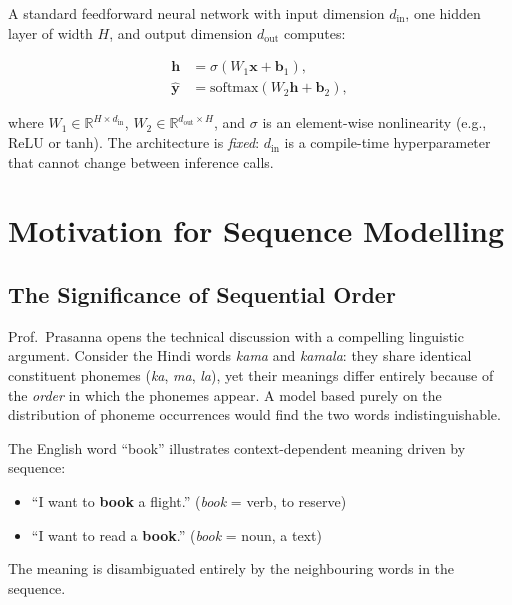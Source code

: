 \documentclass[12pt,a4paper]{article}
\begin{document}
A standard feedforward neural network with input dimension $d_{\text{in}}$,
one hidden layer of width $H$, and output dimension $d_{\text{out}}$ computes:

\begin{align}
  \label{eq:ffnn_hidden}
  \mathbf{h} &= \sigma\!\left(W_1 \mathbf{x} + \mathbf{b}_1\right), \\
  \label{eq:ffnn_output}
  \hat{\mathbf{y}} &= \text{softmax}\!\left(W_2 \mathbf{h} + \mathbf{b}_2\right),
\end{align}

where $W_1 \in \mathbb{R}^{H \times d_{\text{in}}}$,
$W_2 \in \mathbb{R}^{d_{\text{out}} \times H}$, and $\sigma$ is an
element-wise nonlinearity (e.g., ReLU or tanh).  The architecture is
\emph{fixed}: $d_{\text{in}}$ is a compile-time hyperparameter that cannot
change between inference calls.

\section{Motivation for Sequence Modelling}
\label{sec:motivation}

\subsection{The Significance of Sequential Order}
\label{subsec:order_significance}

Prof.\ Prasanna opens the technical discussion with a compelling linguistic
argument.  Consider the Hindi words \emph{kama} and \emph{kamala}: they
share identical constituent phonemes (\emph{ka}, \emph{ma}, \emph{la}), yet
their meanings differ entirely because of the \emph{order} in which the
phonemes appear.  A model based purely on the distribution of phoneme
occurrences would find the two words indistinguishable.

\begin{example}
The English word ``book'' illustrates context-dependent meaning driven by
sequence:
\begin{itemize}[nosep]
  \item ``I want to \textbf{book} a flight.'' \quad (\textit{book} = verb,
        to reserve)
  \item ``I want to read a \textbf{book}.'' \quad (\textit{book} = noun,
        a text)
\end{itemize}
The meaning is disambiguated entirely by the neighbouring words in the
sequence.
\end{example}
\end{document}
